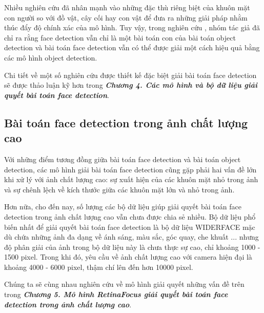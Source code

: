 {    \noindent
    Nhiều nghiên cứu đã nhân mạnh vào những đặc thù riêng biệt của khuôn mặt con người so với đồ vật, cây cối hay con vật để đưa ra những giải pháp nhằm thúc đẩy độ chính xác của mô hình.
    Tuy vậy, trong nghiên cứu \cite{zhu2020tinaface}, nhóm tác giả đã chỉ ra rằng face detection vẫn chỉ là một bài toán con của bài toán object detection và bài toán face detection vẫn có thể được giải một cách hiệu quả bằng các mô hình object detection.

    \noindent
    Chi tiết về một số nghiên cứu được thiết kế đặc biệt giải bài toán face detection sẽ được thảo luận kỹ hơn trong \textbf{\textit{Chương 4. Các mô hình và bộ dữ liệu giải quyết bài toán face detection}}.
    
    \subsection{Bài toán face detection trong ảnh chất lượng cao}
    Với những điểm tương đồng giữa bài toán face detection và bài toán object detection, các mô hình giải bài toán face detection cũng gặp phải hai vấn đề lớn khi xử lý với ảnh chất lượng cao: sự xuất hiện của các khuôn mặt nhỏ trong ảnh và sự chênh lệch về kích thước giữa các khuôn mặt lớn và nhỏ trong ảnh.

    \noindent
    Hơn nữa, cho đến nay, số lượng các bộ dữ liệu giúp giải quyết bài toán face detection trong ảnh chất lượng cao vẫn chưa được chia sẻ nhiều.
    Bộ dữ liệu phổ biến nhất để giải quyết bài toán face detection là bộ dữ liệu WIDERFACE \cite{yang2016wider} mặc dù chứa những ảnh đa dạng về ánh sáng, màu sắc, góc quay, che khuất ... nhưng độ phân giải của ảnh trong bộ dữ liệu này là chưa thực sự cao, chỉ khoảng 1000 - 1500 pixel.
    Trong khi đó, yêu cầu về ảnh chất lượng cao với camera hiện đại là khoảng 4000 - 6000 pixel, thậm chí lên đến hơn 10000 pixel.

    \noindent
    Chúng ta sẽ cùng nhau nghiên cứu về mô hình giải quyết những vấn đề trên trong \textbf{\textit{Chương 5. Mô hình RetinaFocus giải quyết bài toán face detection trong ảnh chất lượng cao}}.
}